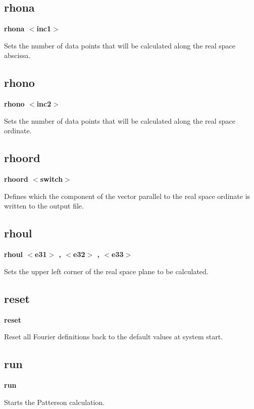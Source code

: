 \subsection*{rhona}
{\bf rhona $ <$inc1$> $ \par }
\par
\vspace{3pt}
Sets the number of data points that will be calculated along the 
real space abscissa. 
\subsection*{rhono}
{\bf rhono $ <$inc2$> $ \par }
\par
\vspace{3pt}
Sets the number of data points that will be calculated along the 
real space ordinate. 
\subsection*{rhoord}
{\bf rhoord $ <$switch$> $ \par }
\par
\vspace{3pt}
Defines which the component of the vector parallel to the 
real space ordinate is written to the output file. 
\subsection*{rhoul}
{\bf rhoul $ <$e31$> $ , $ <$e32$> $ , $ <$e33$> $ \par }
\par
\vspace{3pt}
Sets the upper left corner of the real space plane to be calculated. 
\subsection*{reset}
{\bf reset \par }
\par
\vspace{3pt}
Reset all Fourier definitions back to the default values at 
system start. 
\subsection*{run}
{\bf run \par }
\par
\vspace{3pt}
Starts the Patterson calculation. 

